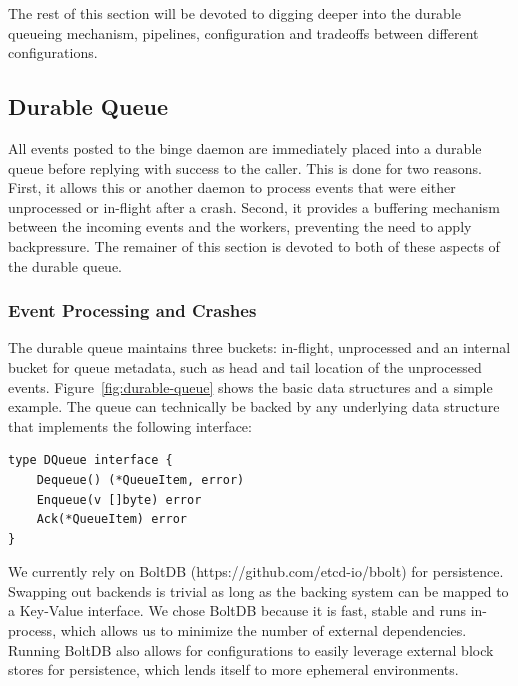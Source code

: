 \documentclass[10pt,twocolumn]{article}
\begin{document}
The rest of this section will be devoted to digging deeper into the durable
queueing mechanism, pipelines, configuration and tradeoffs between different
configurations.

\subsection{Durable Queue}

All events posted to the binge daemon are immediately placed into a durable
queue before replying with success to the caller.  This is done for two
reasons.  First, it allows this or another daemon to process events that were
either unprocessed or in-flight after a crash.  Second, it provides a buffering
mechanism between the incoming events and the workers, preventing the need to
apply backpressure.  The remainer of this section is devoted to both of these
aspects of the durable queue.

\subsubsection{Event Processing and Crashes}

The durable queue maintains three buckets: in-flight, unprocessed and an
internal bucket for queue metadata, such as head and tail location of the
unprocessed events.  Figure~\ref{fig:durable-queue} shows the basic data
structures and a simple example.  The queue can technically be backed by any
underlying data structure that implements the following interface:

\begin{lstlisting}
type DQueue interface {
    Dequeue() (*QueueItem, error)
    Enqueue(v []byte) error
    Ack(*QueueItem) error
}
\end{lstlisting}

We currently rely on BoltDB (https://github.com/etcd-io/bbolt) for persistence.
Swapping out backends is trivial as long as the backing system can be mapped to
a Key-Value interface.  We chose BoltDB because it is fast, stable and runs
in-process, which allows us to minimize the number of external dependencies.
Running BoltDB also allows for configurations to easily leverage external block
stores for persistence, which lends itself to more ephemeral environments.
\end{document}
